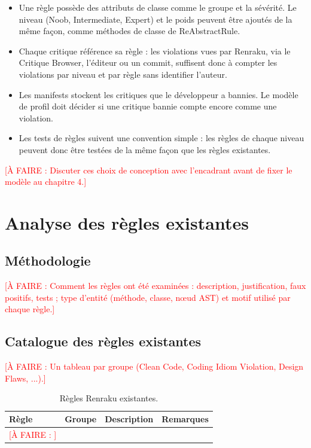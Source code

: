 \documentclass[11pt,a4paper]{report}
\newcommand{\todo}[1]{\textcolor{red}{[À FAIRE : #1]}}
\begin{document}
\begin{itemize}
  \item Une règle possède des attributs de classe comme le groupe et la sévérité. Le niveau (Noob, Intermediate, Expert) et le poids peuvent être ajoutés de la même façon, comme méthodes de classe de ReAbstractRule.
  \item Chaque critique référence sa règle : les violations vues par Renraku, via le Critique Browser, l’éditeur ou un commit, suffisent donc à compter les violations par niveau et par règle sans identifier l’auteur.
  \item Les manifests stockent les critiques que le développeur a bannies. Le modèle de profil doit décider si une critique bannie compte encore comme une violation.
  \item Les tests de règles suivent une convention simple : les règles de chaque niveau peuvent donc être testées de la même façon que les règles existantes.
\end{itemize}

\todo{Discuter ces choix de conception avec l’encadrant avant de fixer le modèle au chapitre 4.}

\chapter{Analyse des règles existantes}
\section{Méthodologie}
\todo{Comment les règles ont été examinées : description, justification, faux positifs, tests ; type d’entité (méthode, classe, nœud AST) et motif utilisé par chaque règle.}

\section{Catalogue des règles existantes}
\todo{Un tableau par groupe (Clean Code, Coding Idiom Violation, Design Flaws, ...).}

\begin{table}[h]
\centering
\begin{tabular}{llll}
\toprule
Règle & Groupe & Description & Remarques \\
\midrule
\todo{} & & & \\
\bottomrule
\end{tabular}
\caption{Règles Renraku existantes.}
\end{table}
\end{document}
